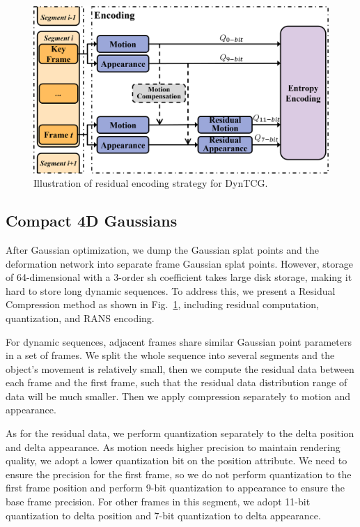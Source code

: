 \begin{figure}[b]
	\centering
	\includegraphics[width=\linewidth]{sec/fig/encoding.png}
	\vspace{-20pt}
	\caption{Illustration of residual encoding strategy for DynTCG.}
	\label{fig:encoding}
\end{figure}
\subsection{Compact 4D Gaussians}
After Gaussian optimization, we dump the Gaussian splat points and the deformation network into separate frame Gaussian splat points. However, storage of 64-dimensional with a 3-order sh coefficient takes large disk storage, making it hard to store long dynamic sequences. To address this, we present a Residual Compression method as shown in Fig.~\ref{fig:encoding}, including residual computation, quantization, and RANS encoding. 

For dynamic sequences, adjacent frames share similar Gaussian point parameters in a set of frames. We split the whole sequence into several segments and the object's movement is relatively small, then we compute the residual data between each frame and the first frame, such that the residual data distribution range of data will be much smaller. Then we apply compression separately to motion and appearance. 

As for the residual data, we perform quantization separately to the delta position and delta appearance. As motion needs higher precision to maintain rendering quality, we adopt a lower quantization bit on the position attribute. We need to ensure the precision for the first frame, so we do not perform quantization to the first frame position and perform 9-bit quantization to appearance to ensure the base frame precision. For other frames in this segment, we adopt 11-bit quantization to delta position and 7-bit quantization to delta appearance. 

